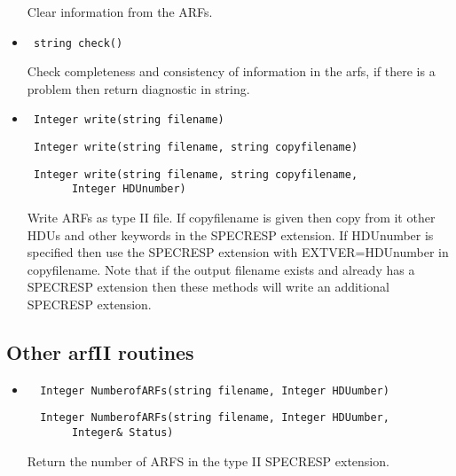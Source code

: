 \documentclass[11pt]{book}
\begin{document}
\begin{itemize}
           Clear information from the ARFs.

\item    \begin{verbatim} string check() \end{verbatim}

           Check completeness and consistency of information in the arfs,
           if there is a problem then return diagnostic in string.

\item  \begin{verbatim} Integer write(string filename) \end{verbatim}
       \begin{verbatim} Integer write(string filename, string copyfilename) \end{verbatim}
       \begin{verbatim} Integer write(string filename, string copyfilename,
       Integer HDUnumber) \end{verbatim}

          Write ARFs as type II file. If copyfilename is given then
          copy from it other HDUs and other keywords in the SPECRESP
          extension. If HDUnumber is specified then use the SPECRESP
          extension with EXTVER=HDUnumber in copyfilename. Note that 
          if the output filename exists and already has a SPECRESP 
          extension then these methods will write an additional 
          SPECRESP extension.




%
%

\end{itemize}

\subsection{Other arfII routines}

\begin{itemize}

\item  \begin{verbatim}  Integer NumberofARFs(string filename, Integer HDUumber) \end{verbatim}
       \begin{verbatim}  Integer NumberofARFs(string filename, Integer HDUumber, 
       Integer& Status) \end{verbatim}

          Return the number of ARFS in the type II SPECRESP extension.

\end{itemize}
\end{document}
